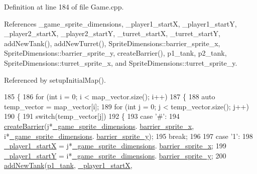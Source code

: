 Definition at line 184 of file Game.\-cpp.



References \-\_\-game\-\_\-sprite\-\_\-dimensions, \-\_\-player1\-\_\-start\-X, \-\_\-player1\-\_\-start\-Y, \-\_\-player2\-\_\-start\-X, \-\_\-player2\-\_\-start\-Y, \-\_\-turret\-\_\-start\-X, \-\_\-turret\-\_\-start\-Y, add\-New\-Tank(), add\-New\-Turret(), Sprite\-Dimensions\-::barrier\-\_\-sprite\-\_\-x, Sprite\-Dimensions\-::barrier\-\_\-sprite\-\_\-y, create\-Barrier(), p1\-\_\-tank, p2\-\_\-tank, Sprite\-Dimensions\-::turret\-\_\-sprite\-\_\-x, and Sprite\-Dimensions\-::turret\-\_\-sprite\-\_\-y.



Referenced by setup\-Initial\-Map().


\begin{DoxyCode}
185 \{
186     \textcolor{keywordflow}{for} (\textcolor{keywordtype}{int} i = 0; i < map\_vector.size(); i++)
187     \{
188         \textcolor{keyword}{auto} temp\_vector = map\_vector[i];
189         \textcolor{keywordflow}{for} (\textcolor{keywordtype}{int} j = 0; j < temp\_vector.size(); j++)
190         \{
191             \textcolor{keywordflow}{switch}(temp\_vector[j])
192             \{
193             \textcolor{keywordflow}{case} \textcolor{charliteral}{'#'}:
194                 \hyperlink{classGame_a14fce36a80fcf6b59d6eba6af3ee23d2}{createBarrier}(j*\hyperlink{classGame_a142a0a8783ff5de45f0377973ab5415a}{\_game\_sprite\_dimensions}.
      \hyperlink{classSpriteDimensions_abcc491d376f31d36013e4f2396dbc408}{barrier\_sprite\_x}, i*\hyperlink{classGame_a142a0a8783ff5de45f0377973ab5415a}{\_game\_sprite\_dimensions}.
      \hyperlink{classSpriteDimensions_abad79766e2254e365d3455b3471a5d0a}{barrier\_sprite\_y});
195                 \textcolor{keywordflow}{break};
196 
197             \textcolor{keywordflow}{case} \textcolor{charliteral}{'1'}:
198                 \hyperlink{classGame_ac3d9582803715a82b0aa03ddc9d9b7f6}{\_player1\_startX} = j*\hyperlink{classGame_a142a0a8783ff5de45f0377973ab5415a}{\_game\_sprite\_dimensions}.
      \hyperlink{classSpriteDimensions_abcc491d376f31d36013e4f2396dbc408}{barrier\_sprite\_x};
199                 \hyperlink{classGame_ac86e7845910feac197a8396c9eedcae9}{\_player1\_startY} = i*\hyperlink{classGame_a142a0a8783ff5de45f0377973ab5415a}{\_game\_sprite\_dimensions}.
      \hyperlink{classSpriteDimensions_abad79766e2254e365d3455b3471a5d0a}{barrier\_sprite\_y};
200                 \hyperlink{classGame_ab77bec9aa745c5fb55794d0bbed4b235}{addNewTank}(\hyperlink{Structures_8h_a6d8f83e710b27d4f86c45f0bb77066e3a31fa78b2b7dd774f5158a16ef230932e}{p1\_tank}, \hyperlink{classGame_ac3d9582803715a82b0aa03ddc9d9b7f6}{\_player1\_startX}, 

\end{DoxyCode}
